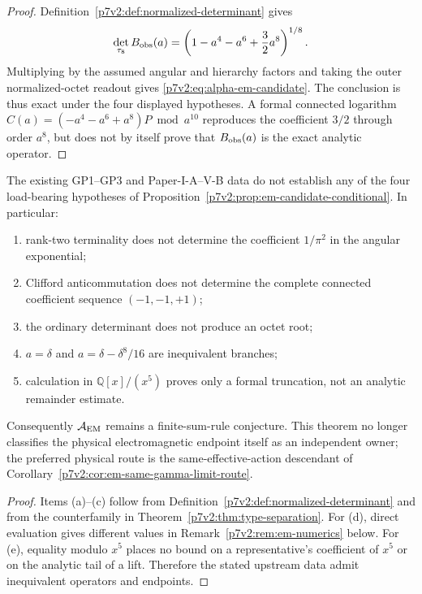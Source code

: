 \documentclass[12pt,a4paper]{article}
\newcommand{\Aem}{\mathcal A_{\rm EM}}
\begin{document}
\begin{proof}
Definition~\ref{p7v2:def:normalized-determinant} gives
\[
 \det_{\tau_8}B_{\rm obs}(a)
 =
 \left(1-a^4-a^6+\frac32a^8\right)^{1/8}.
\]
Multiplying by the assumed angular and hierarchy factors and taking the outer
normalized-octet readout gives
\eqref{p7v2:eq:alpha-em-candidate}.  The conclusion is thus exact under the
four displayed hypotheses.  A formal connected logarithm
\(C(a)=(-a^4-a^6+a^8)P\bmod a^{10}\) reproduces the coefficient \(3/2\)
through order \(a^8\), but does not by itself prove that
\(B_{\rm obs}(a)\) is the exact analytic operator.
\end{proof}

\begin{theorem}
\label{p7v2:thm:em-nonclosure}
The existing GP1--GP3 and Paper-I-A--V-B data do not establish any of the four
load-bearing hypotheses of
Proposition~\ref{p7v2:prop:em-candidate-conditional}.  In particular:
\begin{enumerate}[label=(\alph*),leftmargin=2.5em]
  \item rank-two terminality does not determine the coefficient
  \(1/\pi^2\) in the angular exponential;
  \item Clifford anticommutation does not determine the complete connected
  coefficient sequence \((-1,-1,+1)\);
  \item the ordinary determinant does not produce an octet root;
  \item \(a=\delta\) and
  \(a=\delta-\delta^8/16\) are inequivalent branches;
  \item calculation in \(\mathbb Q[x]/(x^5)\) proves only a formal truncation,
  not an analytic remainder estimate.
\end{enumerate}
Consequently \(\Aem\) remains a finite-sum-rule conjecture.  This theorem
no longer classifies the physical electromagnetic endpoint itself as an
independent owner; the preferred physical route is the same-effective-action
descendant of Corollary~\ref{p7v2:cor:em-same-gamma-limit-route}.
\end{theorem}

\begin{proof}
Items (a)--(c) follow from Definition~\ref{p7v2:def:normalized-determinant}
and from the counterfamily in Theorem~\ref{p7v2:thm:type-separation}.  For
(d), direct evaluation gives different values in
Remark~\ref{p7v2:rem:em-numerics} below.  For (e), equality modulo \(x^5\)
places no bound on a representative's coefficient of \(x^5\) or on the
analytic tail of a lift.  Therefore the stated upstream data admit inequivalent
operators and endpoints.
\end{proof}
\end{document}
